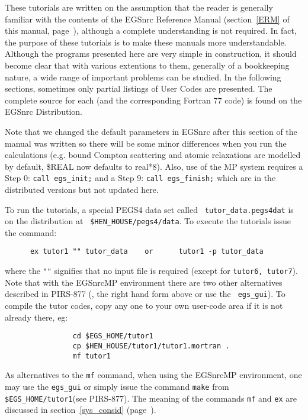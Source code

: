  
These tutorials are written on the assumption that the reader is
generally familiar with the contents of the EGSnrc Reference Manual
(section~\ref{ERM} of this manual, page~\pageref{ERM}), although a
complete understanding is not required.  In fact, the purpose
of these tutorials is to make these manuals more understandable.
Although the programs presented here are very simple in construction,
it should become clear that with various extentions to them, generally
of a bookkeeping nature, a wide range of important problems can be
studied.  In the following sections, sometimes only partial listings of
User Codes are presented.  The complete source for each (and the
corresponding Fortran 77 code) is found on the EGSnrc Distribution. 

Note that we changed the default parameters in EGSnrc after this section of
the manual was written so there will be some minor differences when you run
the calculations (e.g. bound Compton scattering and atomic relaxations are 
modelled by default, \$REAL now defaults to real*8).  Also, use of the MP
system requires a Step 0: {\tt call egs\_init;} and a Step 9: {\tt call
egs\_finish;} which are in the distributed versions but not updated here.


To run the tutorials, a special PEGS4 data set called {\tt
tutor\_data.pegs4dat} is on the distribution at {\tt
\$HEN\_HOUSE/pegs4/data}.  To execute the tutorials issue the
command:
\begin{verbatim}
      ex tutor1 "" tutor_data    or      tutor1 -p tutor_data
\end{verbatim} 
where the {\tt ""} signifies that no input file is required (except for
{\tt tutor6, tutor7}). Note that with the EGSnrcMP environment 
there are two other alternatives described
in PIRS-877\cite{Ka03} (\viz, the right hand form above or use the {\tt
egs\_gui}).  To compile the tutor codes, copy any one to your
own user-code area if it is not already there, eg:
\vspace*{-3mm}
\begin{verbatim}
                cd $EGS_HOME/tutor1
                cp $HEN_HOUSE/tutor1/tutor1.mortran .
                mf tutor1     
\end{verbatim}
\vspace*{-3mm}
As alternatives to the {\tt mf} command, when using the EGSnrcMP
environment, one may use the {\tt egs\_gui} or simply issue the command
{\tt make} from {\tt \$EGS\_HOME/tutor1}(see PIRS-877\cite{Ka03}).
The meaning of the commands {\tt mf} and {\tt ex} are discussed in
section~\ref{sys_consid} (page~\pageref{sys_consid}).

